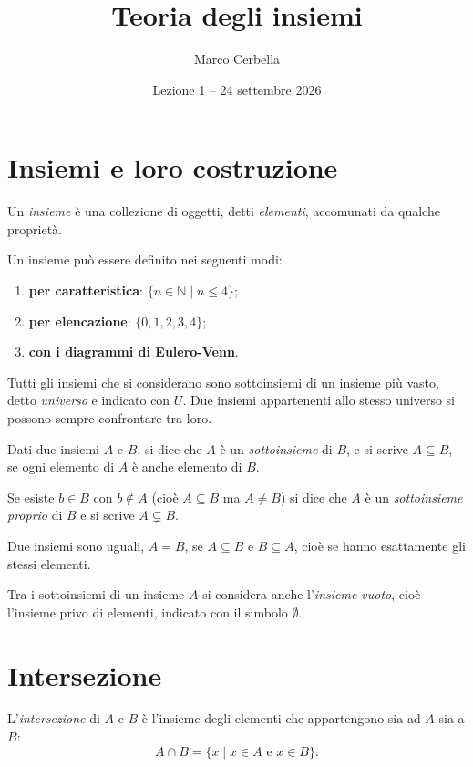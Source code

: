 \documentclass[11pt,a4paper]{article}
\title{Teoria degli insiemi}
\author{Marco Cerbella}
\date{Lezione 1 -- 24 settembre 2026}
\theoremstyle{definition}
\begin{document}
\maketitle

\section{Insiemi e loro costruzione}

\begin{definizione}
Un \emph{insieme} è una collezione di oggetti, detti \emph{elementi},
accomunati da qualche proprietà.
\end{definizione}

Un insieme può essere definito nei seguenti modi:
\begin{enumerate}
    \item \textbf{per caratteristica}: $\{n \in \mathbb{N} \mid n \leq 4\}$;
    \item \textbf{per elencazione}: $\{0, 1, 2, 3, 4\}$;
    \item \textbf{con i diagrammi di Eulero-Venn}.
\end{enumerate}

Tutti gli insiemi che si considerano sono sottoinsiemi di un insieme più
vasto, detto \emph{universo} e indicato con $U$. Due insiemi appartenenti
allo stesso universo si possono sempre confrontare tra loro.

\begin{definizione}
Dati due insiemi $A$ e $B$, si dice che $A$ è un \emph{sottoinsieme} di $B$,
e si scrive $A \subseteq B$, se ogni elemento di $A$ è anche elemento di $B$.
\end{definizione}

Se esiste $b \in B$ con $b \notin A$ (cioè $A \subseteq B$ ma $A \neq B$) si dice che $A$ è un \emph{sottoinsieme proprio} di $B$ e si scrive $A \subsetneq B$.

Due insiemi sono uguali, $A = B$, se $A \subseteq B$ e $B \subseteq A$,
cioè se hanno esattamente gli stessi elementi.

Tra i sottoinsiemi di un insieme $A$ si considera anche l'\emph{insieme vuoto},
cioè l'insieme privo di elementi, indicato con il simbolo $\emptyset$.

\section{Intersezione}

\begin{definizione}
L'\emph{intersezione} di $A$ e $B$ è l'insieme degli elementi che
appartengono sia ad $A$ sia a $B$:
\[
A \cap B = \{x \mid x \in A \text{ e } x \in B\}.
\]
\end{definizione}
\end{document}
